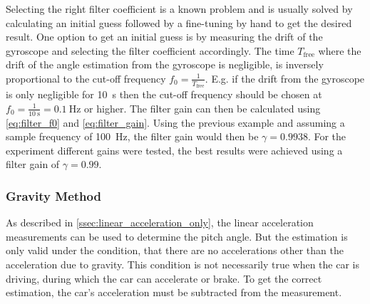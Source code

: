 Selecting the right filter coefficient is a known problem and is usually solved by calculating an initial guess followed by a fine-tuning by hand to get the desired result.
One option to get an initial guess is by measuring the drift of the gyroscope and selecting the filter coefficient accordingly.
The time $T_\mathrm{free}$ where the drift of the angle estimation from the gyroscope is negligible, is inversely proportional to the cut-off frequency $f_0 = \frac{1}{T_\mathrm{free}}$.
E.g. if the drift from the gyroscope is only negligible for \SI{10}{\second} then the cut-off frequency should be chosen at $f_0 = \frac{1}{\SI{10}{\second}} = \SI{0.1}{\hertz}$ or higher.
The filter gain can then be calculated using \cref{eq:filter_f0} and \cref{eq:filter_gain}.
Using the previous example and assuming a sample frequency of \SI{100}{\hertz}, the filter gain would then be $\gamma = 0.9938$.
For the experiment different gains were tested, the best results were achieved using a filter gain of $\gamma = 0.99$.

\subsubsection{Gravity Method}
\label{subsubsec:gravity_method}
As described in \cref{ssec:linear_acceleration_only}, the linear acceleration measurements can be used to determine the pitch angle.
But the estimation is only valid under the condition, that there are no accelerations other than the acceleration due to gravity.
This condition is not necessarily true when the car is driving, during which the car can accelerate or brake.
To get the correct estimation, the car's acceleration must be subtracted from the measurement.
